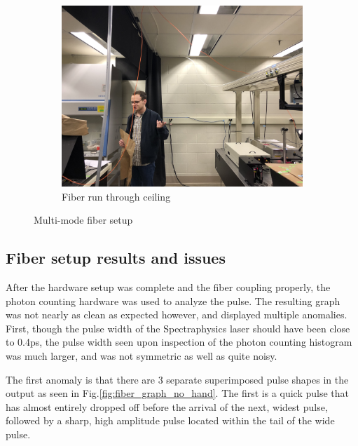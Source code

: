 \documentclass[a4paper]{article}
\begin{document}
\begin{figure}[!htb]
\begin{subfigure}[t]{0.4\textwidth}
         \includegraphics[width=\textwidth]{IMG_6137.jpg}
         \caption{Fiber run through ceiling}
         \label{fig:fiber_ceiling}
         \begin{minipage}{2cm}
         \vfill
         \end{minipage}
     \end{subfigure}
        \caption{Multi-mode fiber setup}
        \label{fig:fiber}
\end{figure}

\subsection{Fiber setup results and issues}

After the hardware setup was complete and the fiber coupling properly, the photon counting hardware was used to analyze the pulse. The resulting graph was not nearly as clean as expected however, and displayed multiple anomalies. First, though the pulse width of the Spectraphysics laser should have been close to 0.4ps, the pulse width seen upon inspection of the photon counting histogram was much larger, and was not symmetric as well as quite noisy.

The first anomaly is that there are 3 separate superimposed pulse shapes in the output as seen in Fig.\ref{fig:fiber_graph_no_hand}. The first is a quick pulse that has almost entirely dropped off before the arrival of the next, widest pulse, followed by a sharp, high amplitude pulse located within the tail of the wide pulse. 
\end{document}
